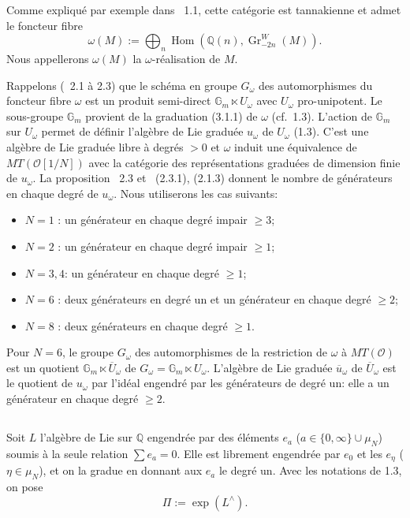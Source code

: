 \documentclass[11pt,a4paper]{article}
\theoremstyle{plain}
\theoremstyle{definition}
\DeclareMathOperator{\Hom}{Hom}
\newcommand{\Gm}{\mathbb{G}_m}
\newcommand{\Q}{\mathbb{Q}}
\newcommand{\Gr}{\operatorname{Gr}}
\begin{document}
Comme expliqu\'e par exemple dans \cite{1}~1.1, cette cat\'egorie est tannakienne et admet le foncteur fibre
\begin{equation}\label{eq:3.1.1}
\omega(M) := \bigoplus_n \Hom(\Q(n), \Gr^W_{-2n}(M)).
\end{equation}
Nous appellerons $\omega(M)$ la $\omega$-r\'ealisation de $M$.

Rappelons (\cite{1}~2.1 \`a 2.3) que le sch\'ema en groupe $G_\omega$ des automorphismes du foncteur fibre $\omega$ est un produit semi-direct $\Gm \ltimes U_\omega$ avec $U_\omega$ pro-unipotent. Le sous-groupe $\Gm$ provient de la graduation (3.1.1) de $\omega$ (cf.~1.3). L'action de $\Gm$ sur $U_\omega$ permet de d\'efinir l'alg\`ebre de Lie gradu\'ee $u_\omega$ de $U_\omega$ (1.3). C'est une alg\`ebre de Lie gradu\'ee libre \`a degr\'es $> 0$ et $\omega$ induit une \'equivalence de $MT(\mathcal{O}[1/N])$ avec la cat\'egorie des repr\'esentations gradu\'ees de dimension finie de $u_\omega$. La proposition \cite{1}~2.3 et \cite{1}~(2.3.1), (2.1.3) donnent le nombre de g\'en\'erateurs en chaque degr\'e de $u_\omega$. Nous utiliserons les cas suivants:

\begin{itemize}[leftmargin=2em]
\item $N=1$ : un g\'en\'erateur en chaque degr\'e impair $\geq 3$;
\item $N=2$ : un g\'en\'erateur en chaque degr\'e impair $\geq 1$;
\item $N=3,4$: un g\'en\'erateur en chaque degr\'e $\geq 1$;
\item $N=6$ : deux g\'en\'erateurs en degr\'e un et un g\'en\'erateur en chaque degr\'e $\geq 2$;
\item $N=8$ : deux g\'en\'erateurs en chaque degr\'e $\geq 1$.
\end{itemize}

Pour $N=6$, le groupe $G_\omega$ des automorphismes de la restriction de $\omega$ \`a $MT(\mathcal{O})$ est un quotient $\Gm \ltimes \overline{U}_\omega$ de $G_\omega = \Gm \ltimes U_\omega$. L'alg\`ebre de Lie gradu\'ee $\overline{u}_\omega$ de $\overline{U}_\omega$ est le quotient de $u_\omega$ par l'id\'eal engendr\'e par les g\'en\'erateurs de degr\'e un: elle a un g\'en\'erateur en chaque degr\'e $\geq 2$.

\subsection{}
Soit $L$ l'alg\`ebre de Lie sur $\Q$ engendr\'ee par des \'el\'ements $e_a$ ($a \in \{0, \infty\} \cup \mu_N$) soumis \`a la seule relation $\sum e_a = 0$. Elle est librement engendr\'ee par $e_0$ et les $e_\eta$ ($\eta \in \mu_N$), et on la gradue en donnant aux $e_a$ le degr\'e un. Avec les notations de 1.3, on pose
\[
\Pi := \exp(L^{\wedge}).
\]
\end{document}
